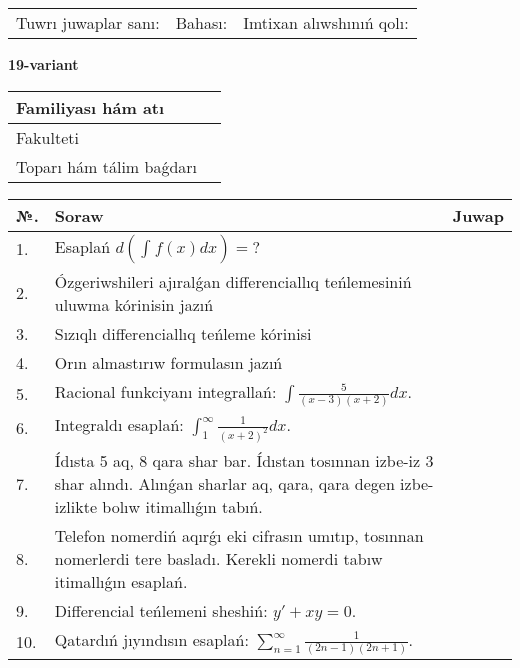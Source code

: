 \documentclass{article}
\begin{document}
\vspace{1cm}

\begin{tabular}{ c c c }
Tuwrı juwaplar sanı: \underline{\hspace{2cm}} & Bahası: \underline{\hspace{2cm}} & Imtixan alıwshınıń qolı: \underline{\hspace{2cm}} \\
\end{tabular}

\newpage

\begin{center}\textbf{19-variant}\end{center}

\bgroup
\def\arraystretch{1.5}
\begin{tabular}{ |m{6cm}|m{10cm}| }
  \hline
  Familiyası hám atı & \\
  \hline
  Fakulteti &\\
  \hline
  Toparı hám tálim baǵdarı & \\
  \hline
\end{tabular}
\egroup

\vspace{0.5cm}

\bgroup
\def\arraystretch{2}
\begin{tabular}{ |l|m{8cm}|m{7cm}| }
  \hline
  №. & Soraw & Juwap \\
  \hline
  1. & Esaplań $\displaystyle d\left( \int_{}^{}{f(x)dx} \right) = ?$ &  \\
  \hline
  2. & Ózgeriwshileri ajıralǵan differenciallıq teńlemesiniń uluwma kórinisin jazıń &  \\
  \hline
  3. & Sızıqlı differenciallıq teńleme kórinisi &  \\
  \hline
  4. & Orın almastırıw formulasın jazıń &  \\
  \hline
  5. & Racional funkciyanı integrallań: $\displaystyle\int {\frac{5}{(x - 3)(x + 2)}dx}$. &  \\
  \hline
  6. & Integraldı esaplań: $\displaystyle\int_{1}^{\infty}{\frac{1}{\left( x + 2 \right)^{2}}dx }$. &  \\
  \hline
  7. & Ídısta 5 aq, 8 qara shar bar. Ídıstan tosınnan izbe-iz 3 shar alındı. Alınǵan sharlar aq, qara, qara degen izbe-izlikte bolıw itimallıǵın tabıń. &  \\
  \hline
  8. & Telefon nomerdiń aqırǵı eki cifrasın umıtıp, tosınnan nomerlerdi tere basladı. Kerekli nomerdi tabıw itimallıǵın esaplań. &  \\
  \hline
  9. & Differencial teńlemeni sheshiń: $y' + xy = 0$. &  \\
  \hline
  10. & Qatardıń jıyındısın esaplań: $\displaystyle\sum_{n = 1}^{\infty}\frac{1}{(2n - 1)(2n + 1)}$. &  \\
  \hline
\end{tabular}
\egroup
\end{document}
